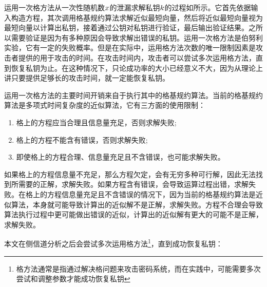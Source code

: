 {\begin{figure}[!htb]
		\label{fig:solver}	
	\end{figure}
	
	运用一次格方法从一次性随机数$x$的泄漏求解私钥$k$的过程如所示。它首先依据输入构造方程，其次调用格基规约算法求解近似最短向量，然后将近似最短向量视为最短向量以计算出私钥，接着通过公钥对私钥进行验证，最后输出验证结果。之所以需要验证是因为有多种原因会导致求解出错误的私钥。运用一次格方法是伯努利实验，它有一定的失败概率。但是在实际中，运用格方法次数的唯一限制因素是攻击者提供的用于攻击的时间。在攻击时间内，攻击者可以尝试多次运用格方法，直到恢复私钥为止。在这种情况下，只论成功率的大小已经意义不大，因为从理论上讲只要提供足够长的攻击时间，就一定能恢复私钥。%
	
	运用一次格方法的主要时间开销来自于执行其中的格基规约算法。当前的格基规约算法是多项式时间复杂度的近似算法，它有三方面的使用限制：
	
	\begin{enumerate}
		\item 格上的方程应当合理且信息量充足，否则求解失败;
		\item 格上的方程不能含有错误，否则求解失败;
		\item 即使格上的方程合理、信息量充足且不含错误，也可能求解失败。
	\end{enumerate}
	
	如果格上的方程信息量不充足，那么方程欠定，会有无穷多种可行解，因此无法找到所需要的正解，求解失败。如果方程含有错误，会导致运算过程出错，求解失败。在格上的方程信息量充足且不含错误的情况下，因为当前的格基规约算法是近似算法，本身就可能导致计算出的近似解不是正解，求解失败。方程不合理会导致算法执行过程中更可能做出错误的近似，计算出的近似解有更大的可能不是正解，求解失败。
	
	本文在侧信道分析之后会尝试多次运用格方法\footnote{格方法通常是指通过解决格问题来攻击密码系统，而在实践中，可能需要多次尝试和调整参数才能成功恢复私钥}，直到成功恢复私钥：
	
}
